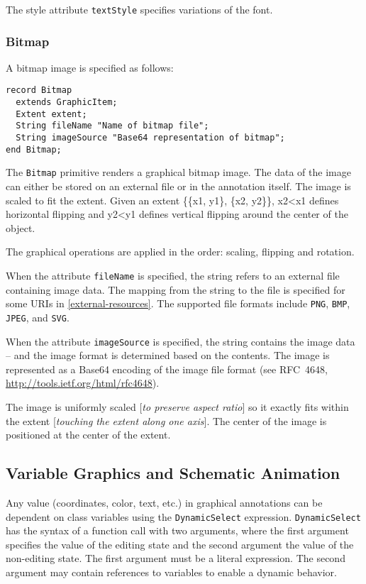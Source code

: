 The style attribute \lstinline!textStyle! specifies variations of the font.

\subsubsection{Bitmap}

A bitmap image is specified as follows:

\begin{lstlisting}[language=modelica]
record Bitmap
  extends GraphicItem;
  Extent extent;
  String fileName "Name of bitmap file";
  String imageSource "Base64 representation of bitmap";
end Bitmap;
\end{lstlisting}
The \lstinline!Bitmap! primitive renders a graphical bitmap image. The data of the
image can either be stored on an external file or in the annotation
itself. The image is scaled to fit the extent. Given an extent \{\{x1,
y1\}, \{x2, y2\}\}, x2\textless{}x1 defines horizontal flipping and
y2\textless{}y1 defines vertical flipping around the center of the
object.

The graphical operations are applied in the order: scaling, flipping and
rotation.

When the attribute \lstinline!fileName! is specified, the string refers to an
external file containing image data. The mapping from the string to the
file is specified for some URIs in \autoref{external-resources}. The supported file
formats include \lstinline!PNG!, \lstinline!BMP!, \lstinline!JPEG!,
and \lstinline!SVG!.

When the attribute \lstinline!imageSource! is specified, the string contains the
image data -- and the image format is determined based on the contents.
The image is represented as a Base64 encoding of the image file format
(see RFC~4648, \url{http://tools.ietf.org/html/rfc4648}).

The image is uniformly scaled {[}\emph{to preserve aspect ratio}{]} so
it exactly fits within the extent {[}\emph{touching the extent along one
axis}{]}. The center of the image is positioned at the center of the
extent.

\subsection{Variable Graphics and Schematic Animation}

Any value (coordinates, color, text, etc.) in graphical annotations can
be dependent on class variables using the \lstinline!DynamicSelect! expression.
\lstinline!DynamicSelect! has the syntax of a function call with two arguments,
where the first argument specifies the value of the editing state and
the second argument the value of the non-editing state. The first
argument must be a literal expression. The second argument may contain
references to variables to enable a dynamic behavior.

